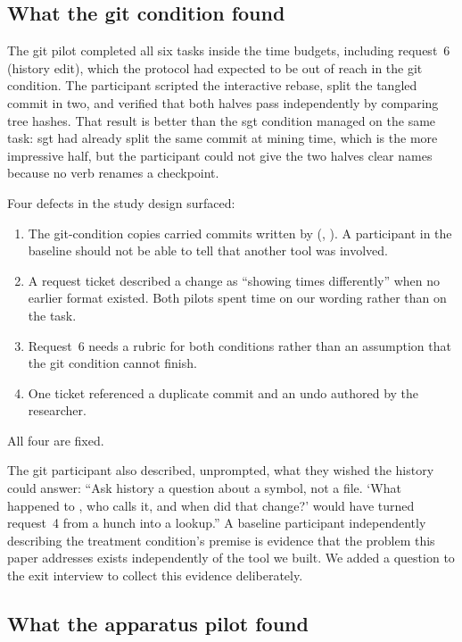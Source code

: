 \subsection{What the git condition found}
\label{sec:pilot-git}

The git pilot completed all six tasks inside the time budgets, including
request~6 (history edit), which the protocol had expected to be out of reach in
the git condition. The participant scripted the interactive rebase, split the
tangled commit in two, and verified that both halves pass independently by
comparing tree hashes. That result is better than the sgt condition managed on
the same task: sgt had already split the same commit at mining time, which is
the more impressive half, but the participant could not give the two halves
clear names because no verb renames a checkpoint.

Four defects in the study design surfaced:
\begin{enumerate}
\item The git-condition copies carried commits written by \sgt{}
  (, ).
  A participant in the baseline should not be able to tell that another tool was
  involved.
\item A request ticket described a change as ``showing times differently'' when
  no earlier format existed. Both pilots spent time on our wording rather than
  on the task.
\item Request~6 needs a rubric for both conditions rather than an assumption
  that the git condition cannot finish.
\item One ticket referenced a duplicate commit and an undo authored by the
  researcher.
\end{enumerate}
All four are fixed.

The git participant also described, unprompted, what they wished the history
could answer: ``Ask history a question about a symbol, not a file. `What
happened to , who calls it, and when did that change?' would have
turned request~4 from a hunch into a lookup.'' A baseline participant
independently describing the treatment condition's premise is evidence that the
problem this paper addresses exists independently of the tool we built. We
added a question to the exit interview to collect this evidence deliberately.

\subsection{What the apparatus pilot found}
\label{sec:pilot-apparatus}

